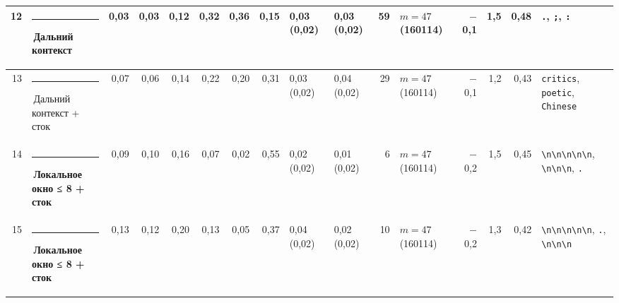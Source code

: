 \documentclass[10pt]{article}
\begin{document}
\begin{minipage}{\linewidth}
\begin{center}
{\begin{tabular}{|r|l|r|r|r|r|r|r|l|l|r|l|r|r|r|l|}
12 & \textcolor[HTML]{C3C2B7}{\rule{0.62em}{0.62em}}\,Дальний контекст & 0,03 & 0,03 & 0,12 & 0,32 & 0,36 & 0,15 & 0,03 (0,02) & 0,03 (0,02) & 59 & $m{=}47$ (160114) & $-$0,1 & 1,5 & 0,48 & \texttt{\textvisiblespace{}.}, \texttt{\textvisiblespace{};}, \texttt{\textvisiblespace{}:} \\ \hline
13 & \textcolor[HTML]{C3C2B7}{\rule{0.62em}{0.62em}}\,Дальний контекст + сток & 0,07 & 0,06 & 0,14 & 0,22 & 0,20 & 0,31 & 0,03 (0,02) & 0,04 (0,02) & 29 & $m{=}47$ (160114) & $-$0,1 & 1,2 & 0,43 & \texttt{\textvisiblespace{}critics}, \texttt{\textvisiblespace{}poetic}, \texttt{\textvisiblespace{}Chinese} \\ \hline
14 & \textcolor[HTML]{1BAF7A}{\rule{0.62em}{0.62em}}\,\textbf{Локальное окно ≤ 8 + сток} & 0,09 & 0,10 & 0,16 & 0,07 & 0,02 & 0,55 & 0,02 (0,02) & 0,01 (0,02) & 6 & $m{=}47$ (160114) & $-$0,2 & 1,5 & 0,45 & \texttt{\textvisiblespace{}\textbackslash{}n\textbackslash{}n\textbackslash{}n\textbackslash{}n\textbackslash{}n}, \texttt{\textvisiblespace{}\textbackslash{}n\textbackslash{}n\textbackslash{}n}, \texttt{\textvisiblespace{}.} \\ \hline
15 & \textcolor[HTML]{1BAF7A}{\rule{0.62em}{0.62em}}\,\textbf{Локальное окно ≤ 8 + сток} & 0,13 & 0,12 & 0,20 & 0,13 & 0,05 & 0,37 & 0,04 (0,02) & 0,02 (0,02) & 10 & $m{=}47$ (160114) & $-$0,2 & 1,3 & 0,42 & \texttt{\textvisiblespace{}\textbackslash{}n\textbackslash{}n\textbackslash{}n\textbackslash{}n\textbackslash{}n}, \texttt{\textvisiblespace{}.}, \texttt{\textvisiblespace{}\textbackslash{}n\textbackslash{}n\textbackslash{}n} \\ \hline
\hline\end{tabular}}\end{center}
\end{minipage}
\par\vspace{0.4em}
\end{document}

